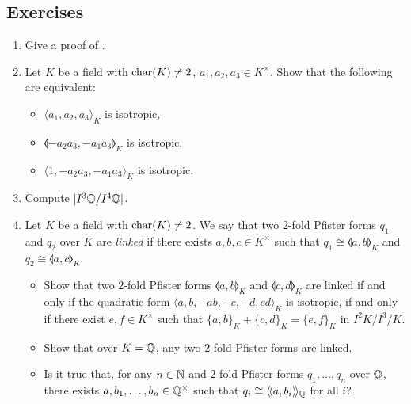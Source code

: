 \documentclass[12pt, leqno, british]{amsart}
\begin{document}
\subsection{Exercises}
\begin{enumerate}
\item Give a proof of .
\item\label{ex:3-dim-reduction} Let $K$ be a field with $\operatorname{char}(K) \neq 2$, $a_1, a_2, a_3 \in K^\times$.
Show that the following are equivalent:
\begin{itemize}
\item $\langle a_1, a_2, a_3 \rangle_{K}$ is isotropic,
\item $\llangle -a_2a_3, -a_1a_3 \rrangle_K$ is isotropic,
\item $\langle 1, -a_2a_3, -a_1a_3 \rangle_K$ is isotropic.
\end{itemize}
\item Compute $\lvert I^3 \mathbb Q/I^4 \mathbb Q \rvert$.
\item Let $K$ be a field with $\operatorname{char}(K) \neq 2$.
We say that two $2$-fold Pfister forms $q_1$ and $q_2$ over $K$ are \emph{linked} if there exists $a, b, c \in K^\times$ such that $q_1 \cong \llangle a, b \rrangle_K$ and $q_2 \cong \llangle a, c \rrangle_K$.
\begin{itemize}
\item Show that two $2$-fold Pfister forms $\llangle a, b \rrangle_K$ and $\llangle c, d \rrangle_K$ are linked if and only if the quadratic form $\langle a, b, -ab, -c, -d, cd \rangle_K$ is isotropic, if and only if there exist $e, f \in K^\times$ such that $\lbrace a, b \rbrace_K + \lbrace c, d \rbrace_K = \lbrace e, f \rbrace_K$ in $I^2K/I^3/K$.
\item Show that over $K = \mathbb Q$, any two $2$-fold Pfister forms are linked.
\item Is it true that, for any $n \in \mathbb N$ and $2$-fold Pfister forms $q_1, \ldots, q_n$ over $\mathbb Q$, there exists $a, b_1, \ldots, b_n \in \mathbb Q^\times$ such that $q_i \cong \langle\!\langle a, b_i \rangle\!\rangle_{\mathbb Q}$ for all $i$?
\end{itemize}
\end{enumerate}
\end{document}
